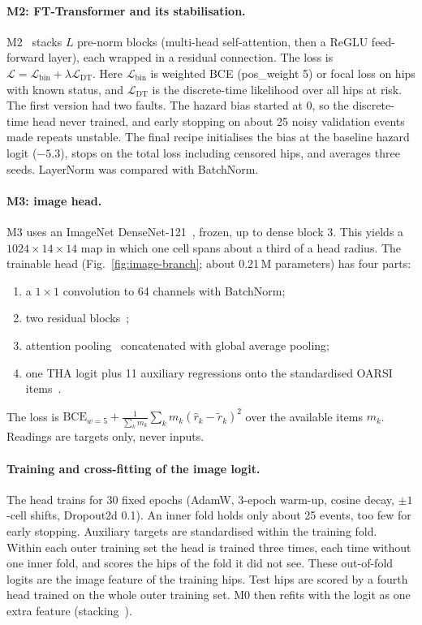 \paragraph{M2: FT-Transformer and its stabilisation.}
M2~\cite{gorishniy2021fttransformer} stacks $L$ pre-norm blocks (multi-head self-attention, then a ReGLU feed-forward
layer), each wrapped in a residual connection. The loss is $\mathcal L=\mathcal L_{\text{bin}}+\lambda\mathcal
L_{\text{DT}}$. Here $\mathcal L_{\text{bin}}$ is weighted BCE (pos\_weight 5) or focal loss on hips with known status,
and $\mathcal L_{\text{DT}}$ is the discrete-time likelihood over all hips at risk. The first version had two faults. The
hazard bias started at 0, so the discrete-time head never trained, and early stopping on about 25 noisy validation
events made repeats unstable. The final recipe initialises the bias at the baseline hazard logit ($-5.3$), stops on the
total loss including censored hips, and averages three seeds. LayerNorm was compared with BatchNorm.

\paragraph{M3: image head.}
M3 uses an ImageNet DenseNet-121~\cite{huang2017densenet}, frozen, up to dense block 3. This yields a
$1024\times14\times14$ map in which one cell spans about a third of a head radius. The trainable head
(Fig.~\ref{fig:image-branch}; about 0.21\,M parameters) has four parts:
\begin{enumerate}[leftmargin=*,itemsep=0pt,topsep=2pt]
  \item a $1\times1$ convolution to 64 channels with BatchNorm;
  \item two residual blocks~\cite{he2016resnet};
  \item attention pooling~\cite{ilse2018attention} concatenated with global average pooling;
  \item one THA logit plus 11 auxiliary regressions onto the standardised OARSI items~\cite{altman2007oarsi}.
\end{enumerate}
The loss is $\mathrm{BCE}_{w=5}+\frac{1}{\sum_k m_k}\sum_k m_k(\hat r_k-\tilde r_k)^2$ over the available items $m_k$.
Readings are targets only, never inputs.

\paragraph{Training and cross-fitting of the image logit.}
The head trains for 30 fixed epochs (AdamW, 3-epoch warm-up, cosine decay, $\pm1$-cell shifts, Dropout2d 0.1). An inner
fold holds only about 25 events, too few for early stopping. Auxiliary targets are standardised within the training
fold. Within each outer training set the head is trained three times, each time without one inner fold, and scores the
hips of the fold it did not see. These out-of-fold logits are the image feature of the training hips. Test hips are
scored by a fourth head trained on the whole outer training set. M0 then refits with the logit as one extra feature
(stacking~\cite{wolpert1992stacked}).

